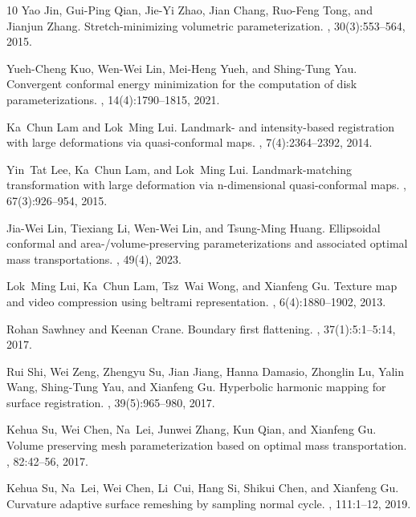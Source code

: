 \documentclass{article}
\begin{document}
\begin{thebibliography}{10}
Yao Jin, Gui-Ping Qian, Jie-Yi Zhao, Jian Chang, Ruo-Feng Tong, and Jianjun
  Zhang.
\newblock Stretch-minimizing volumetric parameterization.
, 30(3):553–564,
  2015.

Yueh-Cheng Kuo, Wen-Wei Lin, Mei-Heng Yueh, and Shing-Tung Yau.
\newblock Convergent conformal energy minimization for the computation of disk
  parameterizations.
, 14(4):1790--1815, 2021.

Ka~Chun Lam and Lok~Ming Lui.
\newblock Landmark- and intensity-based registration with large deformations
  via quasi-conformal maps.
, 7(4):2364--2392, 2014.

Yin~Tat Lee, Ka~Chun Lam, and Lok~Ming Lui.
\newblock Landmark-matching transformation with large deformation via
  n-dimensional quasi-conformal maps.
, 67(3):926–954, 2015.

Jia-Wei Lin, Tiexiang Li, Wen-Wei Lin, and Tsung-Ming Huang.
\newblock Ellipsoidal conformal and area-/volume-preserving parameterizations
  and associated optimal mass transportations.
, 49(4), 2023.

Lok~Ming Lui, Ka~Chun Lam, Tsz~Wai Wong, and Xianfeng Gu.
\newblock Texture map and video compression using beltrami representation.
, 6(4):1880--1902, 2013.

Rohan Sawhney and Keenan Crane.
\newblock Boundary first flattening.
, 37(1):5:1--5:14, 2017.

Rui Shi, Wei Zeng, Zhengyu Su, Jian Jiang, Hanna Damasio, Zhonglin Lu, Yalin
  Wang, Shing-Tung Yau, and Xianfeng Gu.
\newblock Hyperbolic harmonic mapping for surface registration.
, 39(5):965--980, 2017.

Kehua Su, Wei Chen, Na~Lei, Junwei Zhang, Kun Qian, and Xianfeng Gu.
\newblock Volume preserving mesh parameterization based on optimal mass
  transportation.
, 82:42--56, 2017.

Kehua Su, Na~Lei, Wei Chen, Li~Cui, Hang Si, Shikui Chen, and Xianfeng Gu.
\newblock Curvature adaptive surface remeshing by sampling normal cycle.
, 111:1--12, 2019.


\end{thebibliography}
\end{document}
